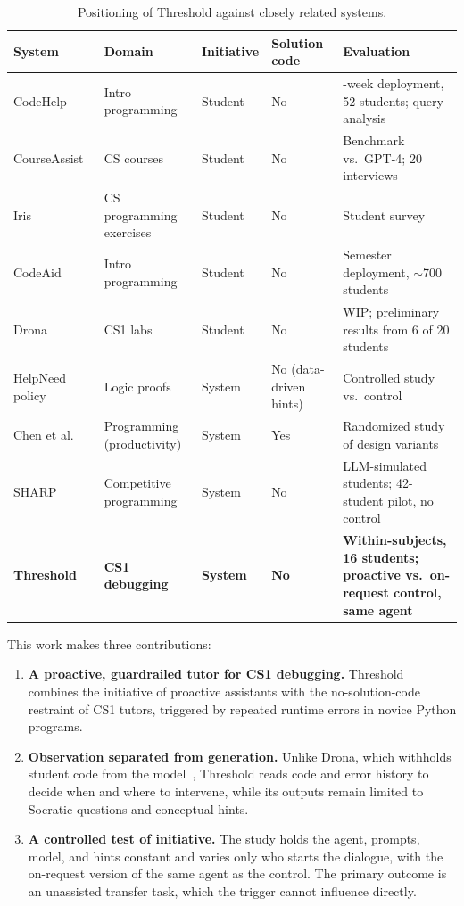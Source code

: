 \documentclass[manuscript,review]{acmart}
\begin{document}
\begin{table}[t]
  \caption{Positioning of Threshold against closely related systems.}
  \label{tab:positioning}
  \small
  \begin{tabularx}{\textwidth}{@{}llll>{\raggedright\arraybackslash}X@{}}
    \toprule
    System & Domain & Initiative & Solution code & Evaluation \\
    \midrule
    CodeHelp~\cite{liffiton2023codehelp,sheese2024patterns} & Intro programming & Student & No & 12-week deployment, 52 students; query analysis \\
    CourseAssist~\cite{feng2024courseassist} & CS courses & Student & No & Benchmark vs.\ GPT-4; 20 interviews \\
    Iris~\cite{bassner2024iris} & CS programming exercises & Student & No & Student survey \\
    CodeAid~\cite{kazemitabaar2024codeaid} & Intro programming & Student & No & Semester deployment, $\sim$700 students \\
    Drona~\cite{deoraj2025guiding} & CS1 labs & Student & No & WIP; preliminary results from 6 of 20 students \\
    HelpNeed policy~\cite{maniktala2020helpneed} & Logic proofs & System & No (data-driven hints) & Controlled study vs.\ control \\
    Chen et al.~\cite{chen2025needhelp} & Programming (productivity) & System & Yes & Randomized study of design variants \\
    SHARP~\cite{wang2026sharp} & Competitive programming & System & No & LLM-simulated students; 42-student pilot, no control \\
    \textbf{Threshold} & \textbf{CS1 debugging} & \textbf{System} & \textbf{No} & \textbf{Within-subjects, 16 students; proactive vs.\ on-request control, same agent} \\
    \bottomrule
  \end{tabularx}
\end{table}

This work makes three contributions:
\begin{enumerate}
  \item \textbf{A proactive, guardrailed tutor for CS1 debugging.} Threshold combines the initiative of proactive assistants with the no-solution-code restraint of CS1 tutors, triggered by repeated runtime errors in novice Python programs.
  \item \textbf{Observation separated from generation.} Unlike Drona, which withholds student code from the model~\cite{deoraj2025guiding}, Threshold reads code and error history to decide when and where to intervene, while its outputs remain limited to Socratic questions and conceptual hints.
  \item \textbf{A controlled test of initiative.} The study holds the agent, prompts, model, and hints constant and varies only who starts the dialogue, with the on-request version of the same agent as the control. The primary outcome is an unassisted transfer task, which the trigger cannot influence directly.
\end{enumerate}
\end{document}
